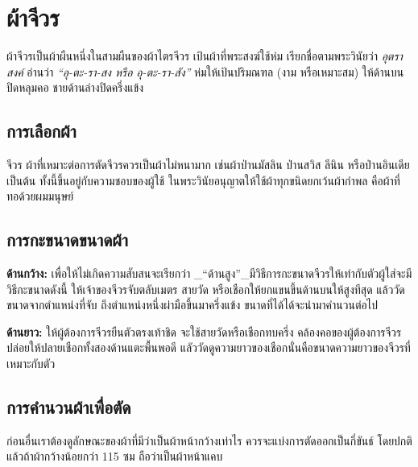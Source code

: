 \chapter{ผ้าจีวร}

ผ้าจีวรเป็นผ้าผืนหนึ่งในสามผืนของผ้าไตรจีวร เป้นผ้าที่พระสงฆ์ใช้ห่ม เรียกชื่อตามพระวินัยว่า
\emph{อุตราสงค์} อ่านว่า \emph{``อุ-ตะ-รา-สง หรือ อุ-ตะ-รา-สัง''} ห่มให้เป้นปริมณฑล
(งาม หรือเหมาะสม) ให้ด้านบนปิดหลุมคอ ชายด้านล่างปิดครึ่งแข้ง

\section{การเลือกผ้า}

จีวร ผ้าที่เหมาะต่อการตัดจีวรควรเป็นผ้าไม่หนามาก เช่นผ้าป่านมัสลิน ป่านสวิส ลีนิน
หรือป่านอินเดียเป็นต้น ทั้งนี้ขึ้นอยู่กับความชอบของผู้ใช้
ในพระวินัยอนุญาตให้ใช้ผ้าทุกขนิดยกเว้นผ้ากำพล คือผ้าที่ทอด้วยผมมนุษย์



\section{การกะขนาดขนาดผ้า}

\textbf{ด้านกว้าง:} เพื่อให้ไม่เกิดความสับสนจะเรียกว่า
\_``ด้านสูง''\_มีวิธีการกะขนาดจีวรให้เท่ากับตัวผู้ใส่จะมีวิธีกะขนาดดังนี้
ให้เจ้าของจีวรจับตลับเมตร สายวัด หรือเชือกให้ยกแขนขึ้นด้านบนให้สูงทีสุด
แล้ววัดขนาดจากตำแหน่งที่จับ ถึงตำแหน่งหนึ่งผ่ามือขึ้นมาครึ่งแข้ง ขนาดที่ได้ได้จะนำมาคำนวนต่อไป



\textbf{ด้านยาว:} ให้ผู้ต้องการจีวรยืนตัวตรงเท้าชิด จะใช้สายวัดหรือเชือกทบครึ่ง
คล้องคอของผู้ต้องการจีวร ปล่อยให้ปลายเชือกทั้งสองด้านแตะพื้นพอดี
แลัววัดดูความยาวของเชือกนั่นคือขนาดความยาวของจีวรที่เหมาะกับตัว



\section{การคำนวนผ้าเพื่อตัด}

ก่อนอื่นเราต้องดูลักษณะของผ้าที่มีว่าเป็นผ้าหน้ากว้างเท่าไร ควรจะแบ่งการตัดออกเป็นกี่ขันธ์
โดยปกติแล้วถ้าผ้ากว้างน้อยกว่า 115 ซม ถือว่าเป็นผ้าหน้าแคบ

